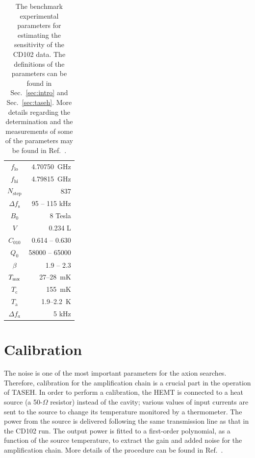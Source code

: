 \documentclass[%
reprint, %
superscriptaddress,
 amsmath,amssymb,
 aps
]{revtex4-2}
\begin{document}
\begin{table}
\caption{The benchmark experimental parameters for estimating the sensitivity 
of the CD102 data. The definitions of the parameters can be found in 
Sec.~\ref{sec:intro} and Sec.~\ref{sec:taseh}. 
More details regarding the determination and the measurements of 
some of the parameters may be found in Ref.~\cite{TASEHInstrumentation}.} 
\label{tab:tasehbenchmark}
\begin{center}
\begin{tabular}{cr}
\hline\hline
 $f_\mathrm{lo}$ & 4.70750~GHz\\
 $f_\mathrm{hi}$ & 4.79815~GHz \\
 $N_\text{step}$ & 837 \\
 $\Delta f_\text{s}$ & 95 -- 115 kHz \\
 $B_0$  & 8 Tesla \\
 $V$ & 0.234 L \\ %
 $C_{010}$ & 0.614 -- 0.630 \\
 $Q_0$ & 58000 -- 65000 \\
 $\beta$ & 1.9 -- 2.3 \\
 $T_{\rm mx}$ & 27--28~mK\\
 $T_\mathrm{c}$ & 155~mK \\
 $T_\text{a}$ & 1.9--2.2~K \\
 $\Delta f_a$ & 5 kHz \\
\hline\hline
\end{tabular}
\end{center}
\end{table}

\section{Calibration} \label{sec:hemtcalibration}
\label{sec:calibration}
The noise is one of the most important parameters for the axion searches. 
Therefore, calibration for the amplification chain is a 
crucial part in the operation of TASEH. In order to perform a calibration, 
the HEMT is connected to a heat source (a 50-$\Omega$ resistor) instead of 
the cavity; 
various values of input currents are sent to the source to change its 
temperature monitored by a thermometer. The power from the source 
is delivered following the same transmission line as that in the CD102 
run. 
The output power is fitted to a first-order polynomial, as a function of 
the source temperature, to extract the gain and added noise for the 
amplification chain. More details of the 
procedure can be found in Ref.~\cite{TASEHInstrumentation}. 
\end{document}
